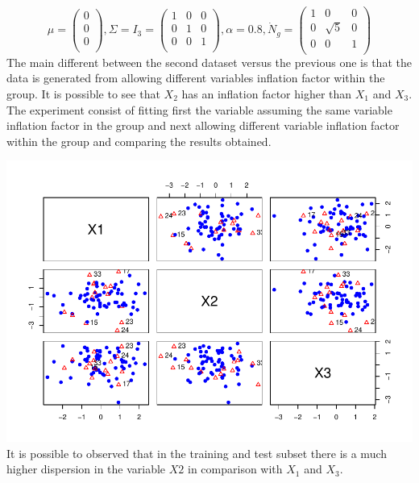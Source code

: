 \documentclass[
]{article}
\newenvironment{Shaded}{\begin{snugshade}}{\end{snugshade}}
\newcommand{\AttributeTok}[1]{\textcolor[rgb]{0.77,0.63,0.00}{#1}}
\newcommand{\DecValTok}[1]{\textcolor[rgb]{0.00,0.00,0.81}{#1}}
\newcommand{\FunctionTok}[1]{\textcolor[rgb]{0.00,0.00,0.00}{#1}}
\newcommand{\NormalTok}[1]{#1}
\newcommand{\SpecialCharTok}[1]{\textcolor[rgb]{0.00,0.00,0.00}{#1}}
\newcommand{\StringTok}[1]{\textcolor[rgb]{0.31,0.60,0.02}{#1}}
\begin{document}
\[
\mu = \begin{pmatrix} 0 \\ 0 \\ 0\\  \end{pmatrix} , \Sigma = I_{3} = \begin{pmatrix} 1 & 0 & 0  \\ 0 & 1 & 0  \\ 0 & 0 & 1   \\ \end{pmatrix}, \alpha = 0.8, \dot{N}_{g} = \begin{pmatrix} 1 & 0 & 0 \\ 0 & \sqrt{5} & 0  \\ 0 & 0 & 1  \\  \end{pmatrix}
\] The main different between the second dataset versus the previous one
is that the data is generated from allowing different variables
inflation factor within the group. It is possible to see that \(X_{2}\)
has an inflation factor higher than \(X_{1}\) and \(X_{3}\). The
experiment consist of fitting first the variable assuming the same
variable inflation factor in the group and next allowing different
variable inflation factor within the group and comparing the results
obtained.

\begin{Shaded}
\end{Shaded}

\includegraphics{DifferentVarInflationFactors_files/figure-latex/plotB_training-1.pdf}
It is possible to observed that in the training and test subset there is
a much higher dispersion in the variable \(X2\) in comparison with
\(X_{1}\) and \(X_{3}\).
\end{document}
